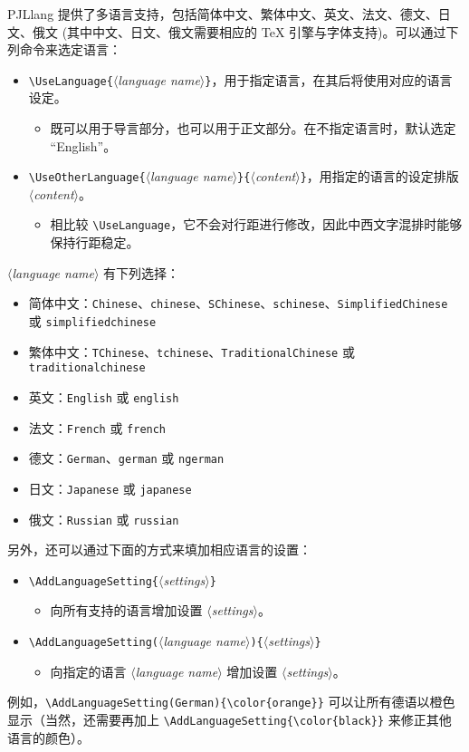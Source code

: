 \documentclass[allowbf]{lebhart}
\providecommand{\meta}[1]{$\langle${\normalfont\itshape#1}$\rangle$}
\providecommand{\PJLlang}{\textsf{PJLlang}}
\begin{document}
\PJLlang{} 提供了多语言支持，包括简体中文、繁体中文、英文、法文、德文、日文、俄文 (其中中文、日文、俄文需要相应的 \TeX{} 引擎与字体支持)。可以通过下列命令来选定语言：
\begin{itemize}
    \item \lstinline|\UseLanguage{|\meta{language name}\lstinline|}|，用于指定语言，在其后将使用对应的语言设定。
    \begin{itemize}
        \item 既可以用于导言部分，也可以用于正文部分。在不指定语言时，默认选定 “English”。
    \end{itemize}
    \item \lstinline|\UseOtherLanguage{|\meta{language name}\lstinline|}{|\meta{content}\lstinline|}|，用指定的语言的设定排版 \meta{content}。
    \begin{itemize}
        \item 相比较 \lstinline|\UseLanguage|，它不会对行距进行修改，因此中西文字混排时能够保持行距稳定。
    \end{itemize}
\end{itemize}

\meta{language name} 有下列选择：
\begin{itemize}
    \item 简体中文：\texttt{Chinese}、\texttt{chinese}、\texttt{SChinese}、\texttt{schinese}、\texttt{SimplifiedChinese} 或 \texttt{simplifiedchinese}
    \item 繁体中文：\texttt{TChinese}、\texttt{tchinese}、\texttt{TraditionalChinese} 或 \texttt{traditionalchinese}
    \item 英文：\texttt{English} 或 \texttt{english}
    \item 法文：\texttt{French} 或 \texttt{french}
    \item 德文：\texttt{German}、\texttt{german} 或 \texttt{ngerman}
    \item 日文：\texttt{Japanese} 或 \texttt{japanese}
    \item 俄文：\texttt{Russian} 或 \texttt{russian}
\end{itemize}

另外，还可以通过下面的方式来填加相应语言的设置：
\begin{itemize}
    \item \lstinline|\AddLanguageSetting{|\meta{settings}\lstinline|}|
    \begin{itemize}
        \item 向所有支持的语言增加设置 \meta{settings}。
    \end{itemize}
    \item \lstinline|\AddLanguageSetting(|\meta{language name}\lstinline|){|\meta{settings}\lstinline|}|
    \begin{itemize}
        \item 向指定的语言 \meta{language name} 增加设置 \meta{settings}。
    \end{itemize}
\end{itemize}
例如，\lstinline|\AddLanguageSetting(German){\color{orange}}| 可以让所有德语以橙色显示（当然，还需要再加上 \lstinline|\AddLanguageSetting{\color{black}}| 来修正其他语言的颜色）。
\end{document}
